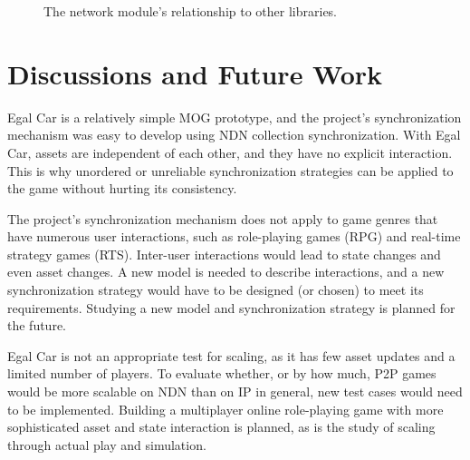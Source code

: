 \documentclass{article}
\begin{document}
\begin{figure}
\begin{center}
\caption{The network module's relationship to other libraries.}
\label{img:networkmodule}
\end{center}
\end{figure}


\section{Discussions and Future Work}
\label{futurework}

Egal Car is a relatively simple MOG prototype, and the project's synchronization mechanism was easy to develop using NDN collection synchronization. With Egal Car, assets are independent of each other, and they have no explicit interaction. This is why unordered or unreliable synchronization strategies can be applied to the game without hurting its consistency.  

The project's synchronization mechanism does not apply to game genres that have numerous user interactions, such as role-playing games (RPG) and real-time strategy games (RTS). Inter-user interactions would lead to state changes and even asset changes. A new model is needed to describe interactions, and a new synchronization strategy would have to be designed (or chosen) to meet its requirements. Studying a new model and synchronization strategy is planned for the future.

Egal Car is not an appropriate test for scaling, as it has few asset updates and a limited number of players. To evaluate whether, or by how much, P2P games would be more scalable on NDN than on IP in general, new test cases would need to be implemented. Building a multiplayer online role-playing game with more sophisticated asset and state interaction is planned, as is the study of scaling through actual play and simulation.
\end{document}
